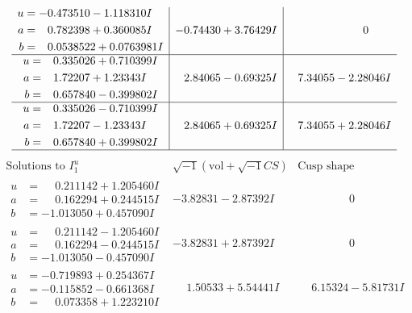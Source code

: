 \documentclass[1p]{elsarticle_modified}
\theoremstyle{definition}
\newcommand{\I}{\sqrt{-1}}
\begin{document}
$$\begin{array}{c|c|c}
\begin{aligned}
u &= -0.473510 - 1.118310 I \\
a &= \phantom{-}0.782398 + 0.360085 I \\
b &= \phantom{-}0.0538522 + 0.0763981 I\end{aligned}
 & -0.74430 + 3.76429 I & \phantom{-0.000000 } 0 \\ \hline\begin{aligned}
u &= \phantom{-}0.335026 + 0.710399 I \\
a &= \phantom{-}1.72207 + 1.23343 I \\
b &= \phantom{-}0.657840 - 0.399802 I\end{aligned}
 & \phantom{-}2.84065 - 0.69325 I & \phantom{-}7.34055 - 2.28046 I \\ \hline\begin{aligned}
u &= \phantom{-}0.335026 - 0.710399 I \\
a &= \phantom{-}1.72207 - 1.23343 I \\
b &= \phantom{-}0.657840 + 0.399802 I\end{aligned}
 & \phantom{-}2.84065 + 0.69325 I & \phantom{-}7.34055 + 2.28046 I\\
 \hline 
 \end{array}$$\newpage$$\begin{array}{c|c|c}  
\text{Solutions to }I^u_{1}& \I (\text{vol} + \sqrt{-1}CS) & \text{Cusp shape}\\
 \hline 
\begin{aligned}
u &= \phantom{-}0.211142 + 1.205460 I \\
a &= \phantom{-}0.162294 + 0.244515 I \\
b &= -1.013050 + 0.457090 I\end{aligned}
 & -3.82831 - 2.87392 I & \phantom{-0.000000 } 0 \\ \hline\begin{aligned}
u &= \phantom{-}0.211142 - 1.205460 I \\
a &= \phantom{-}0.162294 - 0.244515 I \\
b &= -1.013050 - 0.457090 I\end{aligned}
 & -3.82831 + 2.87392 I & \phantom{-0.000000 } 0 \\ \hline\begin{aligned}
u &= -0.719893 + 0.254367 I \\
a &= -0.115852 - 0.661368 I \\
b &= \phantom{-}0.073358 + 1.223210 I\end{aligned}
 & \phantom{-}1.50533 + 5.54441 I & \phantom{-}6.15324 - 5.81731 I \\ \hline\begin{aligned}

\end{aligned}
\end{array}$$
\end{document}
